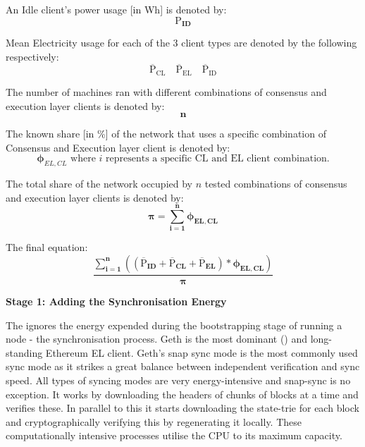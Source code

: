  An Idle client's power usage [in Wh] is denoted by: \begin{equation*}
    \boldsymbol{\mathrm{P}_{ID}}
\end{equation*} 

Mean Electricity usage for each of the 3 client types are denoted by the following respectively: 
\begin{equation*}
  \boldsymbol{\mathrm{{\overline{P}}_{CL}}}\quad      \boldsymbol{\mathrm{{\overline{P}}_{EL}}}\quad  \boldsymbol{\mathrm{{\overline{P}}_{ID}}}   
\end{equation*}

The number of machines ran with different combinations of consensus and execution layer clients is denoted by:
\begin{equation*}
    \boldsymbol{n}
\end{equation*}

The known share [in \%] of the network that uses a specific combination of Consensus and Execution layer client is denoted by:
\begin{equation*}
    \boldsymbol{\phi}_{EL,CL} \text{ where } {i} \text{ represents a specific CL and EL client combination.}
\end{equation*}

The total share of the network occupied by ${n}$ tested combinations of consensus and execution layer clients is denoted by:
\begin{equation*}
    \boldsymbol{{\pi} = \displaystyle\sum\limits_{i=1}^{n}{\phi_{EL,CL}}}
\end{equation*}

The final equation: 
\label{CCRIBaseEqnSection}
\begin{equation}
\boldsymbol{\frac{\displaystyle\sum\limits_{i=1}^{n}{ \left({\left(\mathrm{\overline{P}}_{ID} + \mathrm{\overline{P}}_{CL} + \mathrm{\overline{P}}_{EL}\right)} * {\phi_{EL,CL}} \right)}}
 {\pi}}\label{eqn:CCRI}
\end{equation}



\textbf{Stage 1: Adding the Synchronisation Energy} 

 The  ignores the energy expended during the bootstrapping stage of running a node - the synchronisation process. Geth is the most dominant () and long-standing Ethereum EL client. Geth's snap sync mode is the most commonly used sync mode as it strikes a great balance between independent verification and sync speed.
 All types of syncing modes are very energy-intensive and snap-sync is no exception. It works by downloading the headers of chunks of blocks at a time and verifies these. In parallel to this it starts downloading the state-trie for each block and cryptographically verifying this by regenerating it locally. These computationally intensive processes utilise the CPU to its maximum capacity.

